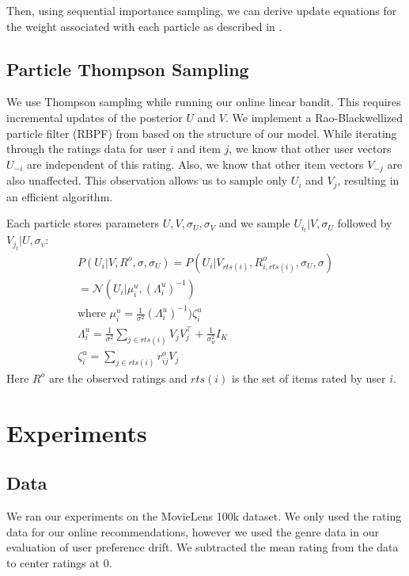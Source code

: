 \documentclass{article}
\begin{document}
Then, using sequential importance sampling, we can derive update equations for the weight associated with each particle as described in \cite{arulampalam2002tutorial}.

\subsection{Particle Thompson Sampling}
We use Thompson sampling while running our online linear bandit. This requires incremental updates
of the posterior $U$ and $V$. We implement a Rao-Blackwellized particle filter (RBPF) from
\cite{kawale2015efficient} based on the structure of our model. While iterating through the
ratings data for user $i$ and item $j$, we know that other user vectors $U_{-i}$ are independent
of this rating. Also, we know that other item vectors $V_{-j}$ are also unaffected. This
observation allows us to sample only $U_i$ and $V_j$, resulting in an efficient algorithm.

Each particle stores parameters $U, V, \sigma_U, \sigma_V$ and we sample $U_{i_t}|V, \sigma_U$
followed by $V_{j_t}|U, \sigma_v$:
\begin{gather*}
P(U_i | V, R^o, \sigma, \sigma_U) = P(U_i | V_{rts(i)}, R^o_{i, rts(i)}, \sigma_U, \sigma) \\
= \mathcal{N}(U_i | \mu^u_i, (\Lambda_i^u)^{-1}) \\
\text{where } \mu_i^u = \frac{1}{\sigma^2}(\Lambda_i^u)^{-1})\zeta_i^u \\
\Lambda_i^u = \frac{1}{\sigma^2} \sum_{j \in rts(i)} V_j V_j^{\top} + \frac{1}{\sigma_u^2}I_K \\
\zeta_i^u = \sum_{j \in rts(i)} r_{ij}^o V_j
\end{gather*}
Here $R^o$ are the observed ratings and $rts(i)$ is the set of items rated by user $i$.

\section{Experiments}

\subsection{Data}
We ran our experiments on the MovieLens 100k dataset. We only used the rating data for our
online recommendations, however we used the genre data in our evaluation of user preference
drift. We subtracted the mean rating from the data to center ratings at 0.
\end{document}
